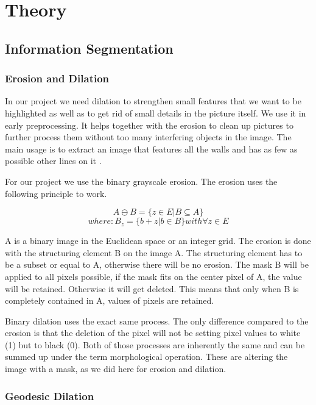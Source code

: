 \section{Theory}
\subsection{Information Segmentation}
\subsubsection{Erosion and Dilation}
\label{subsubsec:Erosion and Dilation}
In our project we need dilation to strengthen small features that we want to be highlighted as well as to get rid of small details in the picture itself. We use it in early preprocessing. It helps together with the erosion to clean up pictures to further process them without too many interfering objects in the image. The main usage is to extract an image that features all the walls and has as few as possible other lines on it \citep{burger_burge_2016}.

For our project we use the binary grayscale erosion.
The erosion uses the following principle to work.


\[A \ominus B = \{ z\in E | B \subseteq A \}\]  
\[where: B_{z} = \{b+z | b \in B\} with \forall z \in E \]

A is a binary image in the Euclidean space or an integer grid. The erosion is done with the structuring element B on the image A. The structuring element has to be a subset or equal to A, otherwise there will be no erosion. The mask B will be applied to all pixels possible, if the mask fits on the center pixel of A, the value will be retained. Otherwise it will get deleted. This means that only when B is completely contained in A, values of pixels are retained.

Binary dilation uses the exact same process. The only difference compared to the erosion is that the deletion of the pixel will not be setting pixel values to white (1) but to black (0). Both of those processes are inherently the same and can be summed up under the term morphological operation. These are altering the image with a mask, as we did here for erosion and dilation.

\subsubsection{Geodesic Dilation}
\label{subsubsec:GeodesicDilation}

